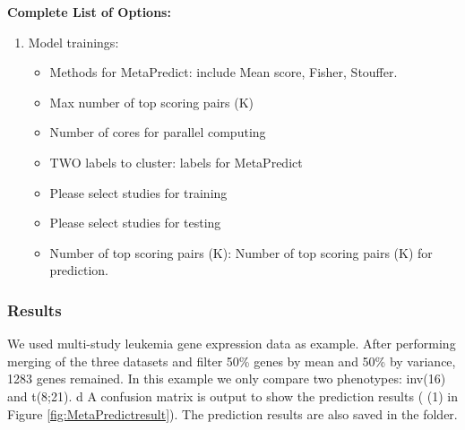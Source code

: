 \textbf{Complete List of Options:} 
\begin{enumerate}
\item Model trainings: 
\begin{itemize}
\item Methods for MetaPredict: include Mean score, Fisher, Stouffer.
\item Max number of top scoring pairs (K)
\item Number of cores for parallel computing
\item TWO labels to cluster: labels for MetaPredict
\item Please select studies for training
\item Please select studies for testing
\item Number of top scoring pairs (K): Number of top scoring pairs (K) for prediction.
\end{itemize}

\end{enumerate}

\subsubsection{Results}

We used multi-study leukemia gene expression data as example.
After performing merging of the three datasets and filter 50\% genes by mean and 50\% by variance, 1283 genes remained.
In this example we only compare two phenotypes: inv(16) and t(8;21). d
A confusion matrix is output to show the prediction results ({\color{red} (1)} in Figure \ref{fig:MetaPredictresult}).
The prediction results are also saved in the folder.

